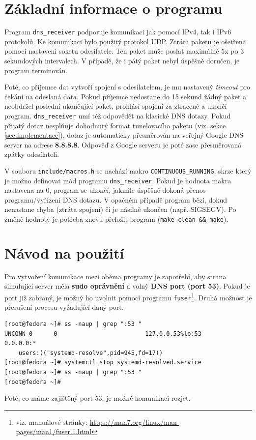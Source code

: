 \documentclass[a4paper,11pt]{article}
\begin{document}
    \section{Základní informace o programu}
    Program \verb|dns_receiver| podporuje komunikaci jak pomocí IPv4, tak i IPv6 protokolů. Ke komunikaci bylo použitý protokol UDP.
    Ztráta paketu je ošetřena pomocí nastavení soketu odesílatele. Ten paket může poslat maximálně 5x
    po 3 sekundových intervalech. V případě, že i pátý paket nebyl úspěšně doručen, je program terminován.

    Poté, co příjemce dat vytvoří spojení s odesílatelem, je mu nastavený \emph{timeout} pro čekání na odeslaná data.
    Pokud příjemce nedostane do 15 sekund žádný paket a neobdržel poslední ukončující paket, prohlásí spojení za ztracené a
    ukončí program. \verb|dns_receiver| umí též odpovědět na klasické DNS dotazy. Pokud přijatý dotaz nesplňuje dohodnutý format
    tunelovacího paketu (viz. sekce \ref{sec:implementace}), dotaz je automaticky přesměrován na veřejný Google DNS server
    na adrese \textbf{8.8.8.8}. Odpověď z Google serveru je poté zase přesměrovaná zpátky odesílateli.

    \label{ReceiverMode}
    V souboru \verb|include/macros.h| se nachází makro \verb|CONTINUOUS_RUNNING|, skrze který je možno definovat mód programu \verb|dns_receiver|.
    Pokud je hodnota makra nastavena na 0, program se ukončí, jakmile úspěšně dokoná přenos programu/vyřízení DNS dotazu. V opačném
    případě program bězí, dokud nenastane chyba (ztráta spojení) či je násilně ukončen (např. SIGSEGV).
    Po změně hodnoty je potřeba znovu přeložit program (\verb|make clean && make|).

    \section{Návod na použití}
    Pro vytvoření komunikace mezi oběma programy je zapotřebí, aby strana simulující server měla \textbf{sudo oprávnění} a
    volný \textbf{DNS port (port 53)}. Pokud je port již zabraný, je možný ho uvolnit pomocí programu
    \verb|fuser|\footnote{viz. manuálové stránky: \url{https://man7.org/linux/man-pages/man1/fuser.1.html}}. Druhá možnost je
    přerušení procesu vyžadující daný port.
    \begin{verbatim}
[root@fedora ~]# ss -naup | grep ":53 "
UNCONN 0      0                         127.0.0.53%lo:53         0.0.0.0:*
    users:(("systemd-resolve",pid=945,fd=17))
[root@fedora ~]# systemctl stop systemd-resolved.service
[root@fedora ~]# ss -naup | grep ":53 "
[root@fedora ~]#\end{verbatim}
    Poté, co máme zajištěný port 53, je možné komunikaci rozjet.
\end{document}
